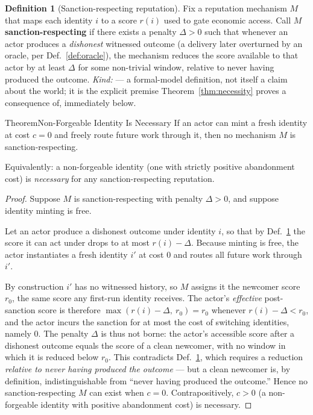 \documentclass[11pt,a4paper]{article}
\theoremstyle{definition}
\newtheorem{definition}{Definition}[section]
\begin{document}
\begin{definition}[Sanction-respecting reputation]\label{def:sanction-respecting}
Fix a reputation mechanism $M$ that maps each identity $i$ to a score $r(i)$ used
to gate economic access. Call $M$ \textbf{sanction-respecting} if there exists a
penalty $\Delta > 0$ such that whenever an actor produces a \emph{dishonest}
witnessed outcome (a delivery later overturned by an oracle, per
Def.~\ref{def:oracle}), the mechanism reduces the score available to that actor by
at least $\Delta$ for some non-trivial window, relative to never having produced
the outcome. \emph{Kind:} \TheoremKind{} --- a formal-model definition, not itself a
claim about the world; it is the explicit premise Theorem~\ref{thm:necessity}
proves a consequence of, immediately below.
\end{definition}

\begin{pdclaim}{Theorem}{Non-Forgeable Identity Is Necessary}
\setlength{\parskip}{4pt plus 1pt}
\label{thm:necessity}
If an actor can mint a fresh identity at cost $c = 0$ and freely route future work
through it, then no mechanism $M$ is sanction-respecting. 

Equivalently: a
non-forgeable identity (one with strictly positive abandonment cost) is
\emph{necessary} for any sanction-respecting reputation.
\end{pdclaim}
\begin{proof}
\setlength{\parskip}{4pt plus 1pt}
Suppose $M$ is sanction-respecting with penalty $\Delta>0$, and suppose identity
minting is free. 

Let an actor produce a dishonest outcome under identity $i$, so
that by Def.~\ref{def:sanction-respecting} the score it can act under drops to at
most $r(i)-\Delta$. Because minting is free, the actor instantiates a fresh
identity $i'$ at cost $0$ and routes all future work through $i'$. 

By construction
$i'$ has no witnessed history, so $M$ assigns it the newcomer score $r_0$, the same
score any first-run identity receives. The actor's \emph{effective} post-sanction
score is therefore $\max(r(i)-\Delta,\ r_0) = r_0$ whenever $r(i)-\Delta < r_0$,
and the actor incurs the sanction for at most the cost of switching identities,
namely $0$. The penalty $\Delta$ is thus not borne: the actor's accessible score
after a dishonest outcome equals the score of a clean newcomer, with no window in
which it is reduced below $r_0$. This contradicts Def.~\ref{def:sanction-respecting},
which requires a reduction \emph{relative to never having produced the outcome} ---
but a clean newcomer is, by definition, indistinguishable from ``never having
produced the outcome.'' Hence no sanction-respecting $M$ can exist when $c=0$.
Contrapositively, $c>0$ (a non-forgeable identity with positive abandonment cost)
is necessary. \qedhere
\end{proof}
\end{document}
